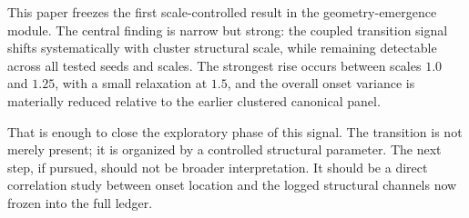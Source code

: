 \documentclass[11pt]{article}
\begin{document}
This paper freezes the first scale-controlled result in the geometry-emergence module. The central finding is narrow but strong: the coupled transition signal shifts systematically with cluster structural scale, while remaining detectable across all tested seeds and scales. The strongest rise occurs between scales $1.0$ and $1.25$, with a small relaxation at $1.5$, and the overall onset variance is materially reduced relative to the earlier clustered canonical panel.

That is enough to close the exploratory phase of this signal. The transition is not merely present; it is organized by a controlled structural parameter. The next step, if pursued, should not be broader interpretation. It should be a direct correlation study between onset location and the logged structural channels now frozen into the full ledger.
\end{document}
